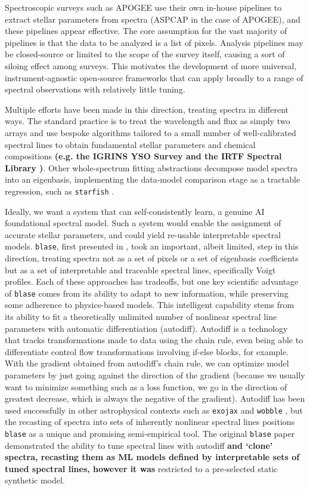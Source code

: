 \documentclass[twocolumn, linenumbers]{aastex631}
\begin{document}
Spectroscopic surveys such as APOGEE \textbf{\citep{APOGEE}} use their own in-house pipelines to extract stellar parameters from spectra (ASPCAP \textbf{\citep{ASPCAP}} in the case of APOGEE), and these pipelines appear effective.
The core assumption for the vast majority of pipelines is that the data to be analyzed is a list of pixels.
Analysis pipelines may be closed-source or limited to the scope of the survey itself, causing a sort of siloing effect among surveys.
This motivates the development of more universal, instrument-agnostic open-source frameworks that can apply broadly to a range of spectral observations with relatively little tuning.

Multiple efforts have been made in this direction, treating spectra in different ways.
The standard practice is to treat the wavelength and flux as simply two arrays and use bespoke algorithms tailored to a small number of well-calibrated spectral lines to obtain fundamental stellar parameters and chemical compositions \textbf{(e.g. the IGRINS YSO Survey \citep{pipeline1} and the IRTF Spectral Library \citep{pipeline2})}.
Other whole-spectrum fitting abstractions decompose model spectra into an eigenbasis, implementing the data-model comparison stage as a tractable regression, such as \texttt{starfish} \citep{starfish}.

Ideally, we want a system that can self-consistently learn, a genuine AI foundational spectral model.
Such a system would enable the assignment of accurate stellar parameters, and could yield re-usable interpretable spectral models.
\texttt{blase}, first presented in \citealt{blase}, took an important, albeit limited, step in this direction, treating spectra not as a set of pixels or a set of eigenbasis coefficients but as a set of interpretable and traceable spectral lines, specifically Voigt profiles.
Each of these approaches has tradeoffs, but one key scientific advantage of \texttt{blase} comes from its ability to adapt to new information, while preserving some adherence to physics-based models.
This intelligent capability stems from its ability to fit a theoretically unlimited number of nonlinear spectral line parameters with automatic differentiation (autodiff).
Autodiff is a technology that tracks transformations made to data using the chain rule, even being able to differentiate control flow transformations involving if-else blocks, for example.
With the gradient obtained from autodiff's chain rule, we can optimize model parameters by just going against the direction of the gradient (because we usually want to minimize something such as a loss function, we go in the direction of greatest decrease, which is always the negative of the gradient).
Autodiff has been used successfully in other astrophysical contexts such as \texttt{exojax} \textbf{\citep{exojax}} and \texttt{wobble} \citep{wobble}, but the recasting of spectra into sets of inherently nonlinear spectral lines positions \texttt{blase} as a unique and promising semi-empirical tool.
The original \texttt{blase} paper demonstrated the ability to tune spectral lines with autodiff \textbf{and `clone' spectra, recasting them as ML models defined by interpretable sets of tuned spectral lines, however it was} restricted to a pre-selected static synthetic model.
\end{document}
